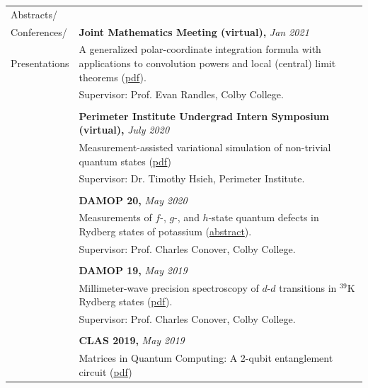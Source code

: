 \documentclass[10pt]{article}
\begin{document}
\begin{longtable}{ l p{14.7cm}   }
\large{Abstracts/}   	& \\
\large{Conferences/}	& \textbf{Joint Mathematics Meeting (virtual),} \textit{Jan 2021}\\
\large{Presentations}	& A generalized polar-coordinate integration formula with applications to convolution powers and local (central) limit theorems (\href{https://jointmathematicsmeetings.org/amsmtgs/2247_abstracts/1163-42-1122.pdf}{{pdf}}).\\
	& Supervisor: Prof. Evan Randles, Colby College. \\
	&\\
	& \textbf{Perimeter Institute Undergrad Intern Symposium (virtual),} \textit{July 2020}\\
	& Measurement-assisted variational simulation of non-trivial quantum states (\href{https://huanqbui.com/LaTeX 20projects/HuanBui_Perimeter/Presentation/MBQC_as_Simulation.pdf}{{pdf}})\\
& Supervisor: Dr. Timothy Hsieh, Perimeter Institute. \\
	&\\
	& \textbf{DAMOP 20,} \textit{May 2020}\\
	& Measurements of $f$-, $g$-, and $h$-state quantum defects in Rydberg states of potassium (\href{http://meetings.aps.org/Meeting/DAMOP20/Session/K01.17}{abstract}).\\
	& Supervisor: Prof. Charles Conover, Colby College.\\
	&\\
	& \textbf{DAMOP 19,} \textit{May 2019} \\
	& Millimeter-wave precision spectroscopy of $d$-$d$ transitions in $^{\text{39}}$K Rydberg states (\href{https://huanqbui.com/research/DAMOP19 20poster/DAMOP19.pdf}{{pdf}}).\\
	& Supervisor: Prof. Charles Conover, Colby College.\\
	& \\
	& \textbf{CLAS 2019,} \textit{May 2019}\\
	& Matrices in Quantum Computing: A 2-qubit entanglement circuit (\href{https://huanqbui.com/LaTeX 20projects/Matrix_Analysis/CLAS 202019/Quantum-Circuit.pdf}{{pdf}})\\

\end{longtable}
\end{document}
